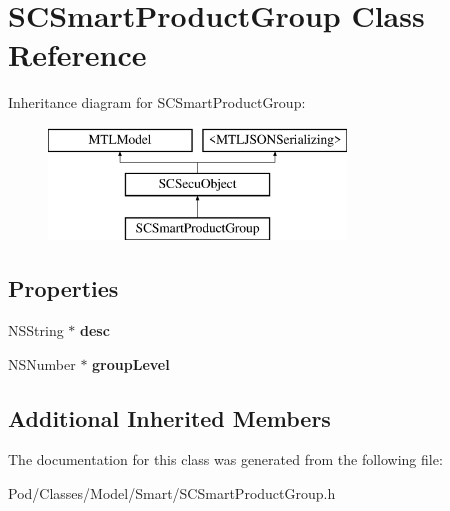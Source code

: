 \hypertarget{interface_s_c_smart_product_group}{}\section{S\+C\+Smart\+Product\+Group Class Reference}
\label{interface_s_c_smart_product_group}
Inheritance diagram for S\+C\+Smart\+Product\+Group\+:\begin{figure}[H]
\begin{center}
\leavevmode
\includegraphics[height=3.000000cm]{interface_s_c_smart_product_group}
\end{center}
\end{figure}
\subsection*{Properties}
\begin{DoxyCompactItemize}
\item 
N\+S\+String $\ast$ {\bfseries desc}\hypertarget{interface_s_c_smart_product_group_a6b1b7a6357f2d075b696fccdad236059}{}\label{interface_s_c_smart_product_group_a6b1b7a6357f2d075b696fccdad236059}

\item 
N\+S\+Number $\ast$ {\bfseries group\+Level}\hypertarget{interface_s_c_smart_product_group_a636b73126f30ade9a3b20e1d43aabf68}{}\label{interface_s_c_smart_product_group_a636b73126f30ade9a3b20e1d43aabf68}

\end{DoxyCompactItemize}
\subsection*{Additional Inherited Members}


The documentation for this class was generated from the following file\+:\begin{DoxyCompactItemize}
\item 
Pod/\+Classes/\+Model/\+Smart/S\+C\+Smart\+Product\+Group.\+h\end{DoxyCompactItemize}
